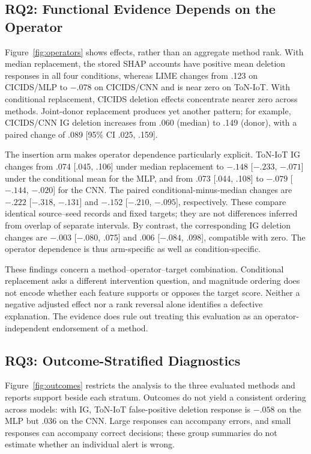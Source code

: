 \subsection{RQ2: Functional Evidence Depends on the Operator}

Figure~\ref{fig:operators} shows effects, rather than an aggregate method rank.
With median replacement, the stored SHAP accounts have positive mean deletion responses in all
four conditions, whereas LIME changes from .123 on CICIDS/MLP to $-.078$
on CICIDS/CNN and is near zero on ToN-IoT. With conditional replacement,
CICIDS deletion effects concentrate nearer zero across methods. Joint-donor
replacement produces yet another pattern; for example, CICIDS/CNN IG deletion
increases from .060 (median) to .149 (donor), with a paired change of
.089 [95\% CI .025, .159].

The insertion arm makes operator dependence particularly explicit.
ToN-IoT IG changes from .074 [.045, .106] under median replacement to
$-.148$ [$-.233$, $-.071$] under the conditional mean for the MLP,
and from .073 [.044, .108] to $-.079$ [$-.144$, $-.020$] for the CNN.
The paired conditional-minus-median changes are $-.222$ [$-.318$, $-.131$]
and $-.152$ [$-.210$, $-.095$], respectively. These compare identical
source--seed records and fixed targets; they are not differences inferred from
overlap of separate intervals. By contrast, the corresponding IG deletion
changes are $-.003$ [$-.080$, .075] and .006 [$-.084$, .098], compatible
with zero. The operator dependence is thus arm-specific as well as
condition-specific.



These findings concern a method--operator--target combination. Conditional
replacement asks a different intervention question, and magnitude ordering
does not encode whether each feature supports or opposes the target score.
Neither a negative adjusted effect nor a rank reversal alone identifies
a defective explanation. The evidence does rule out treating this evaluation
as an operator-independent endorsement of a method.


\subsection{RQ3: Outcome-Stratified Diagnostics}

Figure~\ref{fig:outcomes} restricts the analysis to the three evaluated methods
and reports support beside each stratum. Outcomes do not yield a consistent
ordering across models: with IG, ToN-IoT false-positive deletion response is
$-.058$ on the MLP but .036 on the CNN. Large responses can accompany errors,
and small responses can accompany correct decisions; these group summaries
do not estimate whether an individual alert is wrong.

